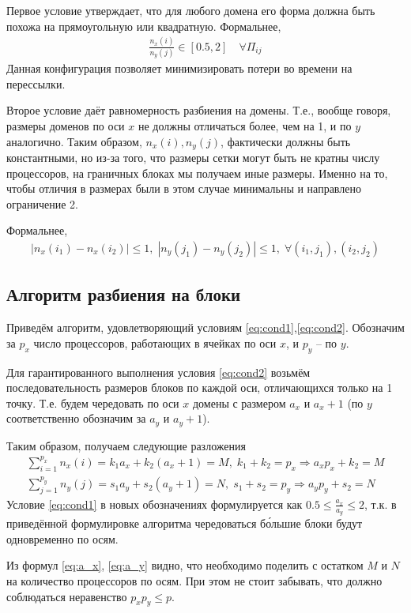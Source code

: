 \documentclass[12pt, fleqn]{article}
\theoremstyle{definition}
\begin{document}
Первое условие утверждает, что для любого домена  его форма должна быть похожа на прямоугольную или квадратную. Формальнее,
\begin{gather}
  \frac{n_x(i)}{n_y(j)} \in [0.5, 2] \quad \forall \Pi_{ij} 
 \label{eq:cond1}
\end{gather}
Данная конфигурация позволяет минимизировать потери во времени на перессылки.

Второе условие даёт равномерность разбиения на домены. Т.е., вообще говоря, размеры доменов по оси $x$ не должны отличаться более, чем на 1, и по $y$ аналогично. Таким образом, $n_x(i), n_y(j)$, фактически должны быть константными, но из-за того, что размеры сетки могут быть не кратны числу процессоров, на граничных блоках мы получаем иные размеры. Именно на то, чтобы отличия в размерах были в этом случае минимальны и направлено ограничение 2. 

Формальнее, 
\begin{gather}
|n_x(i_1) - n_x(i_2)| \leqslant 1, \; |n_y(j_1) - n_y(j_2)| \leqslant 1, \; \forall (i_1, j_1), (i_2, j_2)
\label{eq:cond2}
\end{gather}
\subsection{Алгоритм разбиения на блоки}\label{sec:split}
Приведём алгоритм, удовлетворяющий условиям \ref{eq:cond1},\ref{eq:cond2}.
Обозначим за $p_x$ число процессоров, работающих в ячейках по оси $x$, и $p_y$ -- по $y$. 

Для гарантированного выполнения условия \ref{eq:cond2} возьмём последовательность размеров блоков по каждой оси, отличающихся только на 1 точку. Т.е. будем чередовать по оси $x$ домены с размером $a_x$ и $a_x+1$ (по $y$ соответственно обозначим за $a_y$ и $a_y+1$).

Таким образом, получаем следующие разложения
\begin{gather}
 \sum\limits_{i=1}^{p_x} n_x(i) = k_1 a_x + k_2 (a_x + 1) = M, \; k_1 + k_2 = p_x \Rightarrow a_x p_x + k_2 = M \label{eq:a_x}\\
  \sum\limits_{j=1}^{p_y} n_y(j) = s_1 a_y + s_2 (a_y + 1) = N, \; s_1 + s_2 = p_y \Rightarrow a_y p_y + s_2 = N \label{eq:a_y}
\end{gather}
Условие \ref{eq:cond1} в новых обозначениях формулируется как
$
 0.5 \leqslant \frac{a_x}{a_y} \leqslant 2
$, т.к. в приведённой формулировке алгоритма чередоваться б\'{о}льшие блоки будут одновременно по осям.

Из формул \ref{eq:a_x}, \ref{eq:a_y} видно, что необходимо поделить с остатком $M$  и $N$ на количество процессоров по осям. При этом не стоит забывать, что должно соблюдаться неравенство $p_x p_y \leqslant p$.
\end{document}
